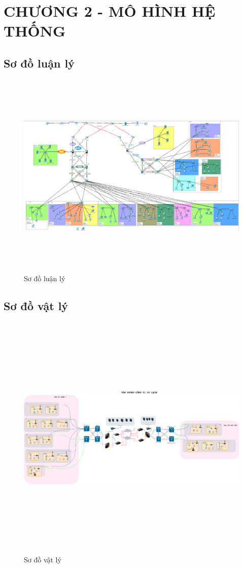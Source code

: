 \documentclass[a4paper, 12pt]{article}
\begin{document}
\section*{CHƯƠNG 2 - MÔ HÌNH HỆ THỐNG}
\setcounter{section}{2}
\setcounter{subsection}{0}
\setcounter{figure}{0}
\setcounter{table}{0}
\subsection{Sơ đồ luận lý}
\begin{figure}[H]
    \centering
    \includegraphics[width=16cm, height=10cm]{img/logic.png}
    \caption{Sơ đồ luận lý}
    \label{hinh21}
\end{figure}
\subsection{Sơ đồ vật lý}
\begin{figure}[H]
    \centering
    \includegraphics[width=16cm, height=12cm]{img/physical.drawio.png}
    \caption{Sơ đồ vật lý}
    \label{hinh22 }
\end{figure}
\end{document}
